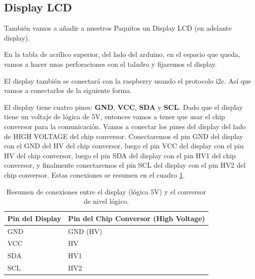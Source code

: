 \subsection{Display LCD}

También vamos a añadir a nuestros Paquitos un Display LCD (en adelante display).

En la tabla de acrílico superior, del lado del arduino, en el espacio que queda, vamos a hacer unas perforaciones con el taladro y fijaremos el display. 

El display también se conectará con la raspberry usando el protocolo i2c. Así que vamos a conectarlos de la siguiente forma. 

El display tiene cuatro pines: \textbf{GND}, \textbf{VCC}, \textbf{SDA} y \textbf{SCL}. Dado que el display tiene un voltaje de lógica de 5V, entonces vamos a tener que usar el chip conversor para la comunicación. Vamos a conectar los pines del display del lado de HIGH VOLTAGE del chip conversor. Conectaremos el pin GND del display con el GND del HV del chip conversor, luego el pin VCC del display con el pin HV del chip conversor, luego el pin SDA del display con el pin HV1 del chip conversor, y finalmente conectaremos el pin SCL del display con el pin HV2 del chip conversor. Estas conexiones se resumen en el cuadro \ref{tab:conexiones_display}.

\begin{table}[htpb]
    \centering
    \renewcommand{\arraystretch}{1.3}
    \begin{tabular}{@{}ll@{}}
        \toprule
        \textbf{Pin del Display} & \textbf{Pin del Chip Conversor (High Voltage)} \\
        \midrule
        GND & GND (HV) \\
        VCC & HV \\
        SDA & HV1 \\
        SCL & HV2 \\
        \bottomrule
    \end{tabular}
    \caption{Resumen de conexiones entre el display (lógica 5V) y el conversor de nivel lógico.}
    \label{tab:conexiones_display}
\end{table}
